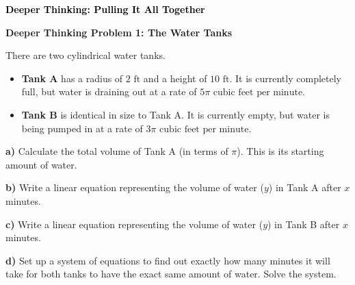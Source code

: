 \documentclass[12pt, letterpaper, fleqn]{article}
\begin{document}
\newpage

\begin{tcolorbox}[colback=customteal!20]
\large\textcolor{black}{\textbf{Deeper Thinking: Pulling It All Together}}
\end{tcolorbox}

\vspace{3mm}

\begin{tcolorbox}[colback=white!15, colframe=black, boxrule=1.5pt, arc=4mm, left=6mm, right=6mm, top=5mm, bottom=5mm]

\textbf{Deeper Thinking Problem 1: The Water Tanks}

\medskip

\noindent
There are two cylindrical water tanks. 

\begin{itemize}
    \item \textbf{Tank A} has a radius of $2\text{ ft}$ and a height of $10\text{ ft}$. It is currently completely full, but water is draining out at a rate of $5\pi\text{ cubic feet per minute}$.
    \item \textbf{Tank B} is identical in size to Tank A. It is currently empty, but water is being pumped in at a rate of $3\pi\text{ cubic feet per minute}$.
\end{itemize}

\vspace{5mm}

\noindent
\textbf{a)} Calculate the total volume of Tank A (in terms of $\pi$). This is its starting amount of water.

\vspace{2cm}

\noindent
\textbf{b)} Write a linear equation representing the volume of water ($y$) in Tank A after $x$ minutes.

\vspace{2cm}

\noindent
\textbf{c)} Write a linear equation representing the volume of water ($y$) in Tank B after $x$ minutes.

\vspace{2cm}

\noindent
\textbf{d)} Set up a system of equations to find out exactly how many minutes it will take for both tanks to have the exact same amount of water. Solve the system.

\vspace{3cm}

\end{tcolorbox}
\end{document}
